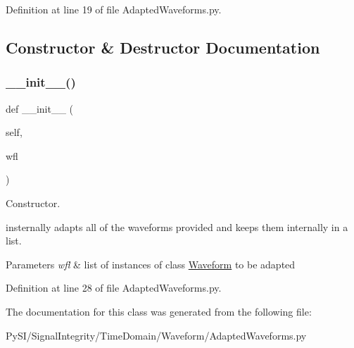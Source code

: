 Definition at line 19 of file Adapted\+Waveforms.\+py.



\subsection{Constructor \& Destructor Documentation}
\mbox{\label{classSignalIntegrity_1_1TimeDomain_1_1Waveform_1_1AdaptedWaveforms_1_1AdaptedWaveforms_a15e87afe4d8ac1102a3665f80cb0611a}} 
\subsubsection{\texorpdfstring{\+\_\+\+\_\+init\+\_\+\+\_\+()}{\_\_init\_\_()}}
{\footnotesize\ttfamily def \+\_\+\+\_\+init\+\_\+\+\_\+ (\begin{DoxyParamCaption}\item[{}]{self,  }\item[{}]{wfl }\end{DoxyParamCaption})}



Constructor. 

insternally adapts all of the waveforms provided and keeps them internally in a list.


\begin{DoxyParams}{Parameters}
{\em wfl} & list of instances of class \hyperlink{namespaceSignalIntegrity_1_1TimeDomain_1_1Waveform_1_1Waveform}{Waveform} to be adapted \\
\hline
\end{DoxyParams}


Definition at line 28 of file Adapted\+Waveforms.\+py.



The documentation for this class was generated from the following file\+:\begin{DoxyCompactItemize}
\item 
Py\+S\+I/\+Signal\+Integrity/\+Time\+Domain/\+Waveform/Adapted\+Waveforms.\+py\end{DoxyCompactItemize}
